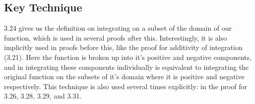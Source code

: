 \documentclass[12pt]{article}
\begin{document}
\subsection*{Key Technique}

3.24 gives us the definition on integrating on a subset of the domain of our function, which is used in several proofs after this. Interestingly, it is also implicitly used in proofs before this, like the proof for additivity of integration (3.21). Here the function is broken up into it's positive and negative components, and in integrating these components individually is equivalent to integrating the original function on the subsets of it's domain where it is positive and negative respectively. This technique is also used several times explicitly: in the proof for 3.26, 3.28, 3.29, and 3.31.
\end{document}
